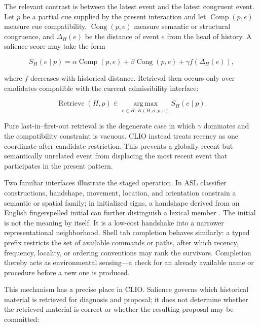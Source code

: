 \documentclass[11pt]{article}
\begin{document}
The relevant contrast is between the latest event and the latest congruent event. Let $p$ be a partial cue supplied by the present interaction and let $\operatorname{Comp}(p,e)$ measure cue compatibility, $\operatorname{Cong}(p,e)$ measure semantic or structural congruence, and $\Delta_H(e)$ be the distance of event $e$ from the head of history. A salience score may take the form

\begin{equation}
S_H(e\mid p)
=
\alpha\operatorname{Comp}(p,e)
+\beta\operatorname{Cong}(p,e)
+\gamma f(\Delta_H(e)),
\label{eq:salience-score}
\end{equation}

where $f$ decreases with historical distance. Retrieval then occurs only over candidates compatible with the current admissibility interface:

\begin{equation}
\operatorname{Retrieve}(H,p)
\in
\operatorname*{arg\,max}_{e\in H:\,K(H,\sigma,p,e)}
S_H(e\mid p).
\label{eq:congruent-recency}
\end{equation}

Pure last-in--first-out retrieval is the degenerate case in which $\gamma$ dominates and the compatibility constraint is vacuous. CLIO instead treats recency as one coordinate after candidate restriction. This prevents a globally recent but semantically unrelated event from displacing the most recent event that participates in the present pattern.

Two familiar interfaces illustrate the staged operation. In ASL classifier constructions, handshape, movement, location, and orientation constrain a semantic or spatial family; in initialized signs, a handshape derived from an English fingerspelled initial can further distinguish a lexical member \cite{herbertpires2017}. The initial is not the meaning by itself. It is a low-cost handshake into a narrower representational neighborhood. Shell tab completion behaves similarly: a typed prefix restricts the set of available commands or paths, after which recency, frequency, locality, or ordering conventions may rank the survivors. Completion thereby acts as environmental sensing---a check for an already available name or procedure before a new one is produced.

This mechanism has a precise place in CLIO. Salience governs which historical material is retrieved for diagnosis and proposal; it does not determine whether the retrieved material is correct or whether the resulting proposal may be committed:
\end{document}
